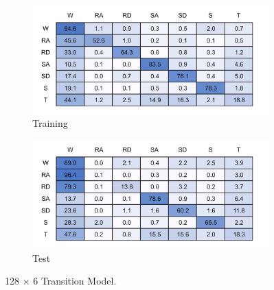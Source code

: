 
\begin{figure}[!hbt]
    \centering
    \begin{subfigure}{.45\textwidth}
        \centering
        \includegraphics[width=\textwidth]{content/4-LSTM_Behaviour/results/conf_matricies/Training_128x6_T.jpg}
        \caption{Training}
        \label{fig:tran_model_conf_matrix_training_128x6}
    \end{subfigure}
    \begin{subfigure}{.45\textwidth}
        \centering
        \includegraphics[width=\textwidth]{content/4-LSTM_Behaviour/results/conf_matricies/Test_128x6_T.jpg}
        \caption{Test}
        \label{fig:tran_model_conf_matrix_test_128x6}
    \end{subfigure}
    \caption{128 $\times$ 6 Transition Model.}
    \label{fig:128x6_transition_confusion_matrix}
\end{figure}
